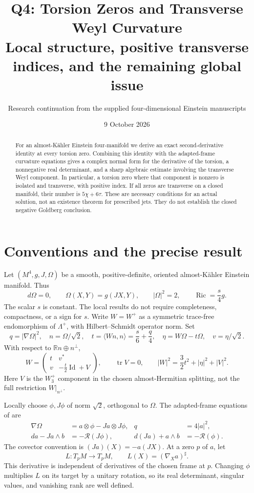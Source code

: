\documentclass[11pt]{article}
\title{Q4: Torsion Zeros and Transverse Weyl Curvature\\[3pt]
\large Local structure, positive transverse indices, and the remaining global issue}
\author{Research continuation from the supplied four-dimensional Einstein manuscripts}
\date{9 October 2026}
\theoremstyle{remark}\newtheorem{remark}[theorem]{Remark}
\newcommand{\Ric}{\operatorname{Ric}}
\newcommand{\tr}{\operatorname{tr}}
\newcommand{\Id}{\operatorname{Id}}
\begin{document}
\maketitle
\begin{abstract}
For an almost-K\"ahler Einstein four-manifold we derive an exact
second-derivative identity at every torsion zero. Combining this identity
with the adapted-frame curvature equations gives a complex normal form
for the derivative of the torsion, a nonnegative real determinant, and a
sharp algebraic estimate involving the transverse Weyl component. In
particular, a torsion zero where that component is nonzero is isolated and
transverse, with positive index. If all zeros are transverse on a closed
manifold, their number is $5\chi+6\tau$. These are necessary conditions for
an actual solution, not an existence theorem for prescribed jets. They do
not establish the closed negative Goldberg conclusion.
\end{abstract}

\section{Conventions and the precise result}
Let $(M^4,g,J,\Omega)$ be a smooth, positive-definite, oriented
almost-K\"ahler Einstein manifold. Thus
\[
 d\Omega=0,\qquad \Omega(X,Y)=g(JX,Y),\qquad |\Omega|^2=2,
 \qquad \Ric=\frac{s}{4}g.
\]
The scalar $s$ is constant. The local results do not require completeness,
compactness, or a sign for $s$. Write $W=W^+$ as a symmetric trace-free
endomorphism of $\Lambda^+$, with Hilbert--Schmidt operator norm. Set
\begin{equation}
 q=|\nabla\Omega|^2,\quad n=\Omega/\sqrt2,\quad
 t=\langle Wn,n\rangle=\frac{s}{6}+\frac q4,\quad
 \eta=W\Omega-t\Omega,\quad v=\eta/\sqrt2.
 \label{eq:defs}
\end{equation}
With respect to $\mathbb Rn\oplus n^\perp$,
\begin{equation}
 W=\begin{pmatrix}t&v^*\\v&-\frac t2\Id+V\end{pmatrix},
 \qquad \tr V=0,\qquad
 |W|^2=\frac32t^2+|\eta|^2+|V|^2.
 \label{eq:Wblock}
\end{equation}
Here $V$ is the $W_3^+$ component in the chosen almost-Hermitian
splitting, not the full restriction $W|_{n^\perp}$.

Locally choose $\phi,J\phi$ of norm $\sqrt2$, orthogonal to $\Omega$.
The adapted-frame equations of \cite[Section 2.3]{AAD} are
\begin{align}
 \nabla\Omega&=a\otimes\phi-Ja\otimes J\phi,& q&=4|a|^2,\label{eq:torsion}\\
 da-Ja\wedge b&=-\mathcal R(J\phi),&
 d(Ja)+a\wedge b&=-\mathcal R(\phi).\label{eq:frame}
\end{align}
The covector convention is $(Ja)(X)=-a(JX)$.
At a zero $p$ of $a$, let
\[
 L:T_pM\longrightarrow T_pM,\qquad L(X)=(\nabla_Xa)^\sharp.
\]
This derivative is independent of derivatives of the chosen frame at $p$.
Changing $\phi$ multiplies $L$ on its target by a unitary rotation, so its
real determinant, singular values, and vanishing rank are well defined.
\end{document}
